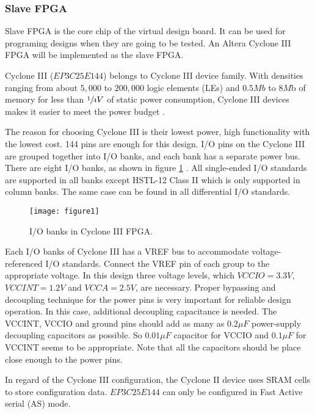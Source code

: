 \subsubsection{Slave FPGA}

Slave FPGA is the core chip of the virtual design board. It can be used for programing designs when they are going to be tested. An Altera Cyclone III FPGA will be implemented as the slave FPGA.

Cyclone III ($EP3C25E144$) belongs to Cyclone III device family. With densities ranging from about $5,000$ to $200,000$ logic elements (LEs) and $0.5Mb$ to $8M$b of memory for less than $\sfrac{1}{4}V$ of static power consumption, Cyclone III devices makes it easier to meet the power budget \citep{Altera:2011:cyclone3handbook}.

The reason for choosing Cyclone III is their lowest power, high functionality with the lowest cost. 144 pins are enough for this design. I/O pins on the Cyclone III are grouped together into I/O banks, and each bank has a separate power bus. There are eight I/O banks, as shown in figure \ref{fig:b2_f1} \citep{Altera:2011:cyclone3handbook}. All single-ended I/O standards are supported in all banks except HSTL-12 Class II which is only supported in column banks. The same case can be found in all differential I/O standards.

\begin{figure}
 \centering
 \texttt{[image: figure1]}
 \caption{I/O banks in Cyclone III FPGA.}
 \label{fig:b2_f1}
\end{figure}

Each I/O banks of Cyclone III has a VREF bus to accommodate voltage-referenced I/O standards. Connect the VREF pin of each group to the appropriate voltage. In this design three voltage levels, which $VCCIO=3.3V$, $VCCINT= 1.2V$ and $VCCA=2.5V$, are necessary. Proper bypassing and decoupling technique for the power pins is very important for reliable design operation. In this case, additional decoupling capacitance is needed. The VCCINT, VCCIO and ground pins should add as many as $0.2\mu F$ power-supply decoupling capacitors as possible. So $0.01\mu F$ capacitor for VCCIO and $0.1\mu F$ for VCCINT seems to be appropriate. Note that all the capacitors should be place close enough to the power pins.

In regard of the Cyclone III configuration, the Cyclone II device uses SRAM cells to store configuration data. $EP3C25E144$ can only be configured in Fast Active serial (AS) mode.

